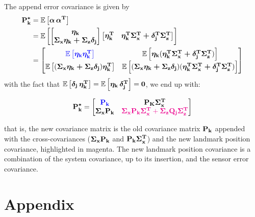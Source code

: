 \documentclass[12pt]{article}
\begin{document}
The append error covariance is given by
\begin{equation}
\begin{aligned}
    \boldsymbol{\mathbf{P_k^*}} &= \mathbb{E}\left[\boldsymbol{\mathbf{\alpha}} \,\boldsymbol{\mathbf{\alpha^T}}\right]\\
    &= \mathbb{E}\left[\begin{bmatrix}
        \boldsymbol{\mathbf{\eta_k}} \\ \boldsymbol{\mathbf{\Sigma_x \eta_k + \Sigma_z \delta_j}}
    \end{bmatrix} \begin{bmatrix}
        \boldsymbol{\mathbf{\eta_k^T}} & \boldsymbol{\mathbf{\eta_k^T \Sigma_x^T + \delta_j^T \Sigma_z^T}}
    \end{bmatrix}\right]\\
    &= \begin{bmatrix}
        \color{blue}\mathbb{E}\left[\boldsymbol{\mathbf{\eta_k}}\boldsymbol{\mathbf{\eta_k^T}}\right]\color{black} & \mathbb{E}\left[\boldsymbol{\mathbf{\eta_k}} 
        (\boldsymbol{\mathbf{\eta_k^T \Sigma_x^T + \delta_j^T \Sigma_z^T}})\right] \\
        \mathbb{E}\left[(\boldsymbol{\mathbf{\Sigma_x \eta_k + \Sigma_z \delta_j}})\boldsymbol{\mathbf{\eta_k^T}}\right] & 
        \mathbb{E}\left[(\boldsymbol{\mathbf{\Sigma_x \eta_k + \Sigma_z \delta_j}})(\boldsymbol{\mathbf{\eta_k^T 
        \Sigma_x^T + \delta_j^T \Sigma_z^T}})\right]
    \end{bmatrix}\\
    \end{aligned}
\end{equation}
with the fact that $\mathbb{E}\left[\boldsymbol{\mathbf{\delta_j \, \eta_k^T}}\right] = \mathbb{E}\left[\boldsymbol{\mathbf{\eta_k \,
\delta_j^T}}\right] = \boldsymbol{\mathbf{0}}$, we end up with:

\begin{equation}
    \boldsymbol{\mathbf{P_k^*}} = \begin{bmatrix}
       \color{blue}\boldsymbol{\mathbf{P_k}}\color{black} & \boldsymbol{\mathbf{P_K \Sigma_x^T}}\\
       \boldsymbol{\mathbf{\Sigma_x P_k}} & \color{magenta}\boldsymbol{\mathbf{\Sigma_x P_k \Sigma_x^T}} 
       + \boldsymbol{\mathbf{\Sigma_z Q_j \Sigma_z^T}}\color{black}
    \end{bmatrix}
\end{equation}

that is, the new covariance matrix is the old covariance matrix $\boldsymbol{\mathbf{P_k}}$ 
appended with the cross-covariances ($\boldsymbol{\mathbf{\Sigma_x P_k}}$ and $\boldsymbol{\mathbf{P_k 
\Sigma_x^T}}$) and the new landmark position covariance, highlighted in magenta. 
The new landmark position covariance is a combination of the system covariance, 
up to its insertion, and the sensor error covariance.

\section{Appendix}
\end{document}
